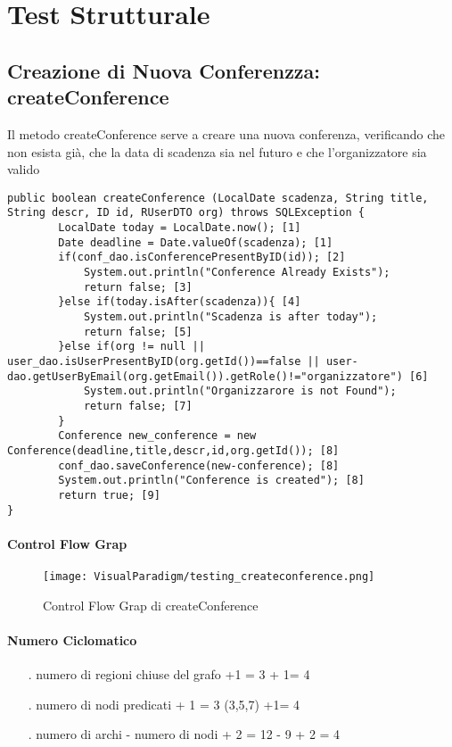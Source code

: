 \section{Test Strutturale}
\label{sec:test_strutturale}

\subsection{Creazione di Nuova Conferenzza: createConference}
Il metodo createConference serve a creare una nuova conferenza, verificando che non esista già, che la data di scadenza sia nel futuro e che l'organizzatore sia valido
\begin{lstlisting}
public boolean createConference (LocalDate scadenza, String title, String descr, ID id, RUserDTO org) throws SQLException { 
        LocalDate today = LocalDate.now(); [1]
        Date deadline = Date.valueOf(scadenza); [1]
        if(conf_dao.isConferencePresentByID(id)); [2]
            System.out.println("Conference Already Exists");
            return false; [3]
        }else if(today.isAfter(scadenza)){ [4]
            System.out.println("Scadenza is after today");
            return false; [5]
        }else if(org != null || user_dao.isUserPresentByID(org.getId())==false || user-dao.getUserByEmail(org.getEmail()).getRole()!="organizzatore") [6]
            System.out.println("Organizzarore is not Found");
            return false; [7]
        }
        Conference new_conference = new Conference(deadline,title,descr,id,org.getId()); [8]
        conf_dao.saveConference(new-conference); [8]
        System.out.println("Conference is created"); [8]
        return true; [9]
}
\end{lstlisting}
\paragraph{Control Flow Grap}
\begin{figure}[ht]
  \centering
  \texttt{[image: VisualParadigm/testing\_createconference.png]}
  \caption{Control Flow Grap di createConference}
  \label{fig:cfg_create_conference }
\end{figure}
\paragraph{Numero Ciclomatico}
\begin{itemize}
\item[.] numero di regioni chiuse del grafo +1 = 3 + 1= 4 
\item[.] numero di nodi predicati + 1 = 3 (3,5,7) +1= 4
\item[.] numero di archi - numero di nodi + 2 = 12 - 9 + 2 = 4 
\end{itemize}
